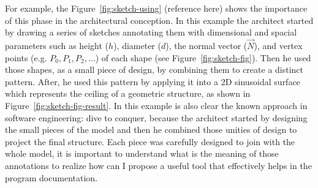 For example, the Figure~\ref{fig:sketch-using} (reference here) shows the importance of this phase in the architectural conception. In this example the architect started by drawing a series of  sketches annotating them with dimensional and spacial parameters such as height ($h$), diameter ($d$), the normal vector ($\vec{N}$), and vertex points (e.g. $P_0, P_1, P_2, ...$) of each shape (see Figure~\ref{fig:sketch-fig}). Then he used those shapes, as a small piece of design, by combining them to create a distinct pattern. After, he used this pattern by applying it into a 2D sinusoidal surface which represents the ceiling of a geometric structure, as shown in Figure~\ref{fig:sketch-fig-result}. In this example is also clear the known approach in software engineering: dive to conquer, because the architect started by designing the small pieces of the model and then he combined those unities of design to project the final structure. Each piece was carefully designed to join with the whole model, it is important to understand what is the meaning of those annotations to realize how can I propose a useful tool that effectively helps in the program documentation.

